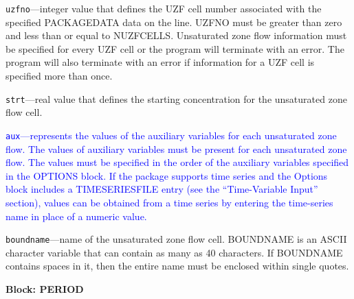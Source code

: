 \begin{description}
\item \texttt{uzfno}---integer value that defines the UZF cell number associated with the specified PACKAGEDATA data on the line. UZFNO must be greater than zero and less than or equal to NUZFCELLS. Unsaturated zone flow information must be specified for every UZF cell or the program will terminate with an error.  The program will also terminate with an error if information for a UZF cell is specified more than once.

\item \texttt{strt}---real value that defines the starting concentration for the unsaturated zone flow cell.

\item \textcolor{blue}{\texttt{aux}---represents the values of the auxiliary variables for each unsaturated zone flow. The values of auxiliary variables must be present for each unsaturated zone flow. The values must be specified in the order of the auxiliary variables specified in the OPTIONS block.  If the package supports time series and the Options block includes a TIMESERIESFILE entry (see the ``Time-Variable Input'' section), values can be obtained from a time series by entering the time-series name in place of a numeric value.}

\item \texttt{boundname}---name of the unsaturated zone flow cell.  BOUNDNAME is an ASCII character variable that can contain as many as 40 characters.  If BOUNDNAME contains spaces in it, then the entire name must be enclosed within single quotes.

\end{description}
\item \textbf{Block: PERIOD}

